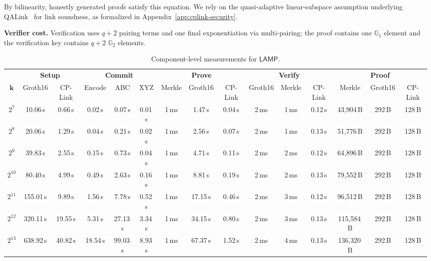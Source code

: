\documentclass[conference,compsoc]{IEEEtran}
\newif\ifshowrevisions
\newenvironment{revblock}[1][]
  {%
    \ifshowrevisions
      \begin{tcolorbox}[
        breakable,
        colback=revisionyellow,
        colframe=revisionyellow,
        boxrule=0pt,
        arc=0pt,
        left=2pt,
        right=2pt,
        top=2pt,
        bottom=2pt,
        before skip=2pt,
        after skip=2pt,
        #1
      ]
    \fi
  }
  {%
    \ifshowrevisions
      \end{tcolorbox}
    \fi
  }
\newcommand{\protocol}{\textsf{LAMP}}   %
\theoremstyle{plain}
\theoremstyle{definition}
\theoremstyle{remark}
\providecommand{\DIFaddbegin}{} %
\begin{document}
By bilinearity, honestly generated proofs satisfy this equation.  We rely on
the quasi-adaptive linear-subspace assumption underlying
QALink~\cite{qa-nizk} for link soundness, as formalized in
Appendix~\ref{app:cplink-security}.

\noindent\textbf{Verifier cost.}
Verification uses \(q+2\) pairing terms and one final exponentiation via
multi-pairing; the proof contains one \(\mathbb{G}_1\) element and the
verification key contains \(q+2\) \(\mathbb{G}_2\) elements.

\DIFaddbegin \begin{table}[!t]
\color{DiffBlue}
\centering
\begin{revblock}[unbreakable]
\setlength{\tabcolsep}{3.5pt}
\begin{adjustbox}{max width=\linewidth}
\begin{tabular}{c cc ccc ccc ccc ccc}
\toprule
&
\multicolumn{2}{c}{\textbf{Setup}}
& \multicolumn{3}{c}{\textbf{Commit}}
& \multicolumn{3}{c}{\textbf{Prove}}
& \multicolumn{3}{c}{\textbf{Verify}}
& \multicolumn{3}{c}{\textbf{Proof}} \\
\cmidrule(lr){2-3}\cmidrule(lr){4-6}\cmidrule(lr){7-9}\cmidrule(lr){10-12}\cmidrule(lr){13-15}
\multirow{-2}{*}{\(\boldsymbol{k}\)}
& Groth16 & CP-Link
& Encode & ABC & XYZ
& Merkle & Groth16 & CP-Link
& Groth16 & Merkle & CP-Link
& Merkle & Groth16 & CP-Link \\
\midrule
$2^7$ & 10.06\,s & 0.66\,s & 0.02\,s & 0.07\,s & 0.01\,s & 1\,ms & 1.47\,s & 0.04\,s & 2\,ms & 1\,ms & 0.12\,s & 43{,}904\,B & 292\,B & 128\,B \\
$2^8$ & 20.06\,s & 1.29\,s & 0.04\,s & 0.21\,s & 0.02\,s & 1\,ms & 2.56\,s & 0.07\,s & 2\,ms & 1\,ms & 0.13\,s & 51{,}776\,B & 292\,B & 128\,B \\
$2^9$ & 39.83\,s & 2.55\,s & 0.15\,s & 0.73\,s & 0.04\,s & 1\,ms & 4.71\,s & 0.11\,s & 2\,ms & 2\,ms & 0.12\,s & 64{,}896\,B & 292\,B & 128\,B \\
$2^{10}$ & 80.40\,s & 4.99\,s & 0.49\,s & 2.63\,s & 0.16\,s & 1\,ms & 8.81\,s & 0.19\,s & 2\,ms & 2\,ms & 0.13\,s & 79{,}552\,B & 292\,B & 128\,B \\
$2^{11}$ & 155.01\,s & 9.89\,s & 1.56\,s & 7.78\,s & 0.52\,s & 1\,ms & 17.15\,s & 0.46\,s & 2\,ms & 3\,ms & 0.12\,s & 96{,}512\,B & 292\,B & 128\,B \\
$2^{12}$ & 320.11\,s & 19.55\,s & 5.31\,s & 27.13\,s & 3.34\,s & 1\,ms & 34.15\,s & 0.80\,s & 2\,ms & 3\,ms & 0.13\,s & 115{,}584\,B & 292\,B & 128\,B \\
$2^{13}$ & 638.92\,s & 40.82\,s & 18.54\,s & 99.03\,s & 8.93\,s & 1\,ms & 67.37\,s & 1.52\,s & 2\,ms & 4\,ms & 0.13\,s & 136{,}320\,B & 292\,B & 128\,B \\
\bottomrule
\end{tabular}
\end{adjustbox}
\end{revblock}
\vspace{6pt}
\caption{Component-level measurements for \(\protocol\).}
\label{tab:lamp-breakdown}
\end{table}
\end{document}
